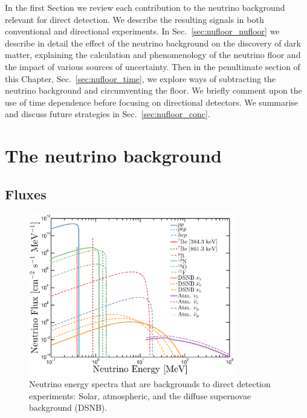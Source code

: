 In the first Section we review each contribution to the neutrino background relevant for direct detection. We describe the resulting signals in both conventional and directional experiments. In Sec.~\ref{sec:nufloor_nufloor} we describe in detail the effect of the neutrino background on the discovery of dark matter, explaining the calculation and phenomenology of the neutrino floor and the impact of various sources of uncertainty. Then in the penultimate section of this Chapter, Sec.~\ref{sec:nufloor_time}, we explore ways of subtracting the neutrino background and circumventing the floor. We briefly comment upon the use of time dependence before focusing on directional detectors. We summarise and discuss future strategies in Sec.~\ref{sec:nufloor_conc}.

\section{The neutrino background}

\subsection{Fluxes}
\begin{figure}
\begin{center}
\includegraphics[trim = 5mm 0 0mm 3mm, clip, width=0.8\textwidth,angle=0]{Figures/neutrino_flux.eps}
\caption[Fluxes for neutrino backgrounds]{Neutrino energy spectra that are backgrounds to direct detection experiments: Solar, atmospheric, and the diffuse supernovae background (DSNB).} 
\label{fig:Flux}
\end{center}
\end{figure} 

